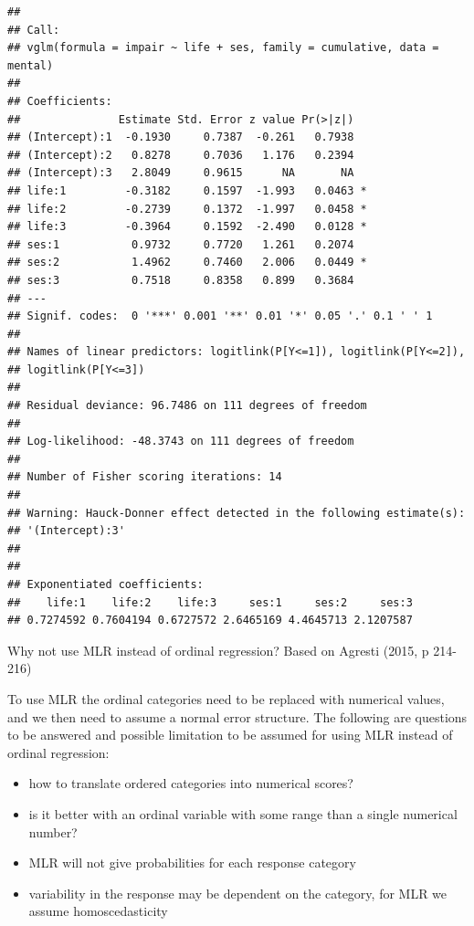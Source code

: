 \documentclass[
  ignorenonframetext,
]{beamer}
\providecommand{\tightlist}{%
  \setlength{\itemsep}{0pt}\setlength{\parskip}{0pt}}
\begin{document}
\begin{frame}[fragile]
\begin{verbatim}
## 
## Call:
## vglm(formula = impair ~ life + ses, family = cumulative, data = mental)
## 
## Coefficients: 
##               Estimate Std. Error z value Pr(>|z|)  
## (Intercept):1  -0.1930     0.7387  -0.261   0.7938  
## (Intercept):2   0.8278     0.7036   1.176   0.2394  
## (Intercept):3   2.8049     0.9615      NA       NA  
## life:1         -0.3182     0.1597  -1.993   0.0463 *
## life:2         -0.2739     0.1372  -1.997   0.0458 *
## life:3         -0.3964     0.1592  -2.490   0.0128 *
## ses:1           0.9732     0.7720   1.261   0.2074  
## ses:2           1.4962     0.7460   2.006   0.0449 *
## ses:3           0.7518     0.8358   0.899   0.3684  
## ---
## Signif. codes:  0 '***' 0.001 '**' 0.01 '*' 0.05 '.' 0.1 ' ' 1
## 
## Names of linear predictors: logitlink(P[Y<=1]), logitlink(P[Y<=2]), 
## logitlink(P[Y<=3])
## 
## Residual deviance: 96.7486 on 111 degrees of freedom
## 
## Log-likelihood: -48.3743 on 111 degrees of freedom
## 
## Number of Fisher scoring iterations: 14 
## 
## Warning: Hauck-Donner effect detected in the following estimate(s):
## '(Intercept):3'
## 
## 
## Exponentiated coefficients:
##    life:1    life:2    life:3     ses:1     ses:2     ses:3 
## 0.7274592 0.7604194 0.6727572 2.6465169 4.4645713 2.1207587
\end{verbatim}
\end{frame}

\begin{frame}
\begin{block}{Why not use MLR instead of ordinal regression?}
\label{why-not-use-mlr-instead-of-ordinal-regression}
Based on Agresti (2015, p 214-216)

To use MLR the ordinal categories need to be replaced with numerical
values, and we then need to assume a normal error structure. The
following are questions to be answered and possible limitation to be
assumed for using MLR instead of ordinal regression:

\begin{itemize}
\tightlist
\item
  how to translate ordered categories into numerical scores?
\item
  is it better with an ordinal variable with some range than a single
  numerical number?
\item
  MLR will not give probabilities for each response category
\item
  variability in the response may be dependent on the category, for MLR
  we assume homoscedasticity
\end{itemize}
\end{block}
\end{frame}
\end{document}

